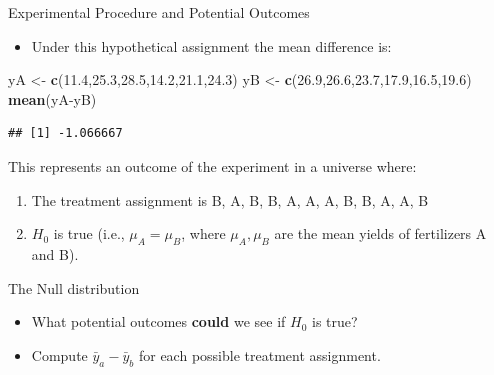 \documentclass[9pt,ignorenonframetext,]{beamer}
\newenvironment{Shaded}{\begin{snugshade}}{\end{snugshade}}
\newcommand{\KeywordTok}[1]{\textcolor[rgb]{0.13,0.29,0.53}{\textbf{{#1}}}}
\newcommand{\FloatTok}[1]{\textcolor[rgb]{0.00,0.00,0.81}{{#1}}}
\newcommand{\StringTok}[1]{\textcolor[rgb]{0.31,0.60,0.02}{{#1}}}
\newcommand{\NormalTok}[1]{{#1}}
\providecommand{\tightlist}{%
\setlength{\itemsep}{0pt}\setlength{\parskip}{0pt}}
\begin{document}
\begin{frame}[fragile]{Experimental Procedure and Potential Outcomes}

\begin{itemize}
\tightlist
\item
  Under this hypothetical assignment the mean difference is:
\end{itemize}

\begin{Shaded}
\begin{Highlighting}[]
\NormalTok{yA <-}\StringTok{ }\KeywordTok{c}\NormalTok{(}\FloatTok{11.4}\NormalTok{,}\FloatTok{25.3}\NormalTok{,}\FloatTok{28.5}\NormalTok{,}\FloatTok{14.2}\NormalTok{,}\FloatTok{21.1}\NormalTok{,}\FloatTok{24.3}\NormalTok{)}
\NormalTok{yB <-}\StringTok{ }\KeywordTok{c}\NormalTok{(}\FloatTok{26.9}\NormalTok{,}\FloatTok{26.6}\NormalTok{,}\FloatTok{23.7}\NormalTok{,}\FloatTok{17.9}\NormalTok{,}\FloatTok{16.5}\NormalTok{,}\FloatTok{19.6}\NormalTok{)}
\KeywordTok{mean}\NormalTok{(yA-yB)}
\end{Highlighting}
\end{Shaded}

\begin{verbatim}
## [1] -1.066667
\end{verbatim}

This represents an outcome of the experiment in a universe where:

\begin{enumerate}
\def\labelenumi{\arabic{enumi}.}
\item
  The treatment assignment is B, A, B, B, A, A, A, B, B, A, A, B
\item
  \(H_0\) is true (i.e., \(\mu_A=\mu_B\), where \(\mu_A,\mu_B\) are the
  mean yields of fertilizers A and B).
\end{enumerate}

\end{frame}

\begin{frame}{The Null distribution}

\begin{itemize}
\tightlist
\item
  What potential outcomes \textbf{could} we see if \(H_0\) is true?
\item
  Compute \({\bar y}_a-{\bar y}_b\) for each possible treatment
  assignment.
\end{itemize}

\end{frame}
\end{document}
